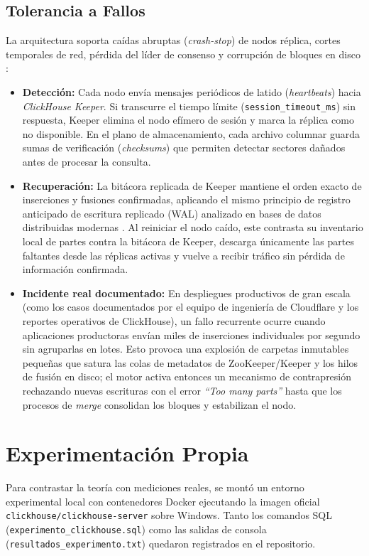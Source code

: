 \documentclass[12pt,a4paper]{article}
\begin{document}
\subsection{Tolerancia a Fallos}
La arquitectura soporta caídas abruptas (\textit{crash-stop}) de nodos réplica, cortes temporales de red, pérdida del líder de consenso y corrupción de bloques en disco \cite{vansteen2023distributed, han2024palf}:
\begin{itemize}[leftmargin=1.2cm]
    \item \textbf{Detección:} Cada nodo envía mensajes periódicos de latido (\textit{heartbeats}) hacia \textit{ClickHouse Keeper}. Si transcurre el tiempo límite (\texttt{session\_timeout\_ms}) sin respuesta, Keeper elimina el nodo efímero de sesión y marca la réplica como no disponible. En el plano de almacenamiento, cada archivo columnar guarda sumas de verificación (\textit{checksums}) que permiten detectar sectores dañados antes de procesar la consulta.
    \item \textbf{Recuperación:} La bitácora replicada de Keeper mantiene el orden exacto de inserciones y fusiones confirmadas, aplicando el mismo principio de registro anticipado de escritura replicado (WAL) analizado en bases de datos distribuidas modernas \cite{han2024palf}. Al reiniciar el nodo caído, este contrasta su inventario local de partes contra la bitácora de Keeper, descarga únicamente las partes faltantes desde las réplicas activas y vuelve a recibir tráfico sin pérdida de información confirmada.
    \item \textbf{Incidente real documentado:} En despliegues productivos de gran escala (como los casos documentados por el equipo de ingeniería de Cloudflare y los reportes operativos de ClickHouse), un fallo recurrente ocurre cuando aplicaciones productoras envían miles de inserciones individuales por segundo sin agruparlas en lotes. Esto provoca una explosión de carpetas inmutables pequeñas que satura las colas de metadatos de ZooKeeper/Keeper y los hilos de fusión en disco; el motor activa entonces un mecanismo de contrapresión rechazando nuevas escrituras con el error \textit{``Too many parts''} hasta que los procesos de \textit{merge} consolidan los bloques y estabilizan el nodo.
\end{itemize}
\FloatBarrier

\section{Experimentación Propia}
Para contrastar la teoría con mediciones reales, se montó un entorno experimental local con contenedores Docker ejecutando la imagen oficial \texttt{clickhouse/clickhouse-server} sobre Windows. Tanto los comandos SQL (\texttt{experimento\_clickhouse.sql}) como las salidas de consola (\texttt{resultados\_experimento.txt}) quedaron registrados en el repositorio.
\end{document}
